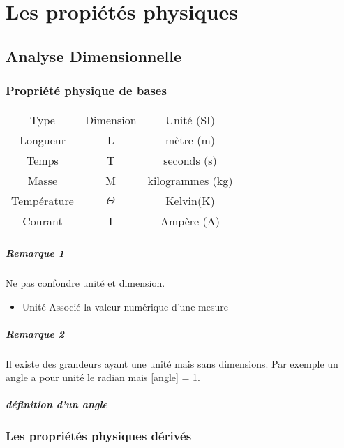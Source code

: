 \chapter{Les propiétés  physiques}
\section{Analyse Dimensionnelle}

\subsection{Propriété physique de bases}

\begin{tabular}{|c|c|c|}
	Type & Dimension & Unité (SI) \\
	Longueur & L & mètre (m)\\
	Temps & T & seconds (s) \\
	Masse & M & kilogrammes (kg) \\
	\hline
	Température & $\Theta$ & Kelvin(K) \\
	Courant & I & Ampère (A)
\end{tabular}

\paragraph{Remarque 1} Ne pas confondre unité et dimension.
\begin{itemize}
	\item{Unité} Associé la valeur numérique d'une mesure
\end{itemize}
\paragraph{Remarque 2} Il existe des grandeurs ayant une unité mais sans dimensions. Par exemple un angle a pour unité le radian mais [angle] = 1.
\paragraph{définition d'un angle} 

\subsection{Les propriétés physiques dérivés}

